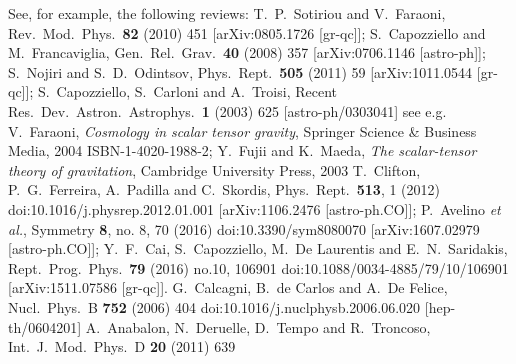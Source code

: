 \documentclass[a4paper,aps,onecolumn,nofootinbib]{revtex4}
\begin{document}
\begin{thebibliography}{999}
 See, for example, the following reviews: 
  T.~P.~Sotiriou and V.~Faraoni,
  Rev.\ Mod.\ Phys.\  {\bf 82} (2010) 451
  [arXiv:0805.1726 [gr-qc]];
  S.~Capozziello and M.~Francaviglia,
  Gen.\ Rel.\ Grav.\  {\bf 40} (2008) 357
  [arXiv:0706.1146 [astro-ph]]; 
  S.~Nojiri and S.~D.~Odintsov,
 Phys.\ Rept.\  {\bf 505} (2011) 59
 [arXiv:1011.0544 [gr-qc]];
S.~Capozziello, S.~Carloni and A.~Troisi,
  Recent Res.\ Dev.\ Astron.\ Astrophys.\  {\bf 1} (2003) 625
  [astro-ph/0303041]
 see e.g. V.~Faraoni,
{\em Cosmology in scalar tensor gravity},
Springer Science \& Business Media, 2004
  ISBN-1-4020-1988-2; 
  Y.~Fujii and K.~Maeda,
{\em The scalar-tensor theory of gravitation},
Cambridge University Press, 2003
  T.~Clifton, P.~G.~Ferreira, A.~Padilla and C.~Skordis,
  Phys.\ Rept.\  {\bf 513}, 1 (2012)
  doi:10.1016/j.physrep.2012.01.001
  [arXiv:1106.2476 [astro-ph.CO]];
  P.~Avelino {\it et al.},
  Symmetry {\bf 8}, no. 8, 70 (2016)
  doi:10.3390/sym8080070
  [arXiv:1607.02979 [astro-ph.CO]];
  Y.~F.~Cai, S.~Capozziello, M.~De Laurentis and E.~N.~Saridakis,
  Rept.\ Prog.\ Phys.\  {\bf 79} (2016) no.10,  106901
  doi:10.1088/0034-4885/79/10/106901
  [arXiv:1511.07586 [gr-qc]].
  G.~Calcagni, B.~de Carlos and A.~De Felice,
  Nucl.\ Phys.\ B {\bf 752} (2006) 404
  doi:10.1016/j.nuclphysb.2006.06.020
  [hep-th/0604201]
   A.~Anabalon, N.~Deruelle, D.~Tempo and R.~Troncoso,
  Int.\ J.\ Mod.\ Phys.\ D {\bf 20} (2011) 639

\end{thebibliography}
\end{document}

